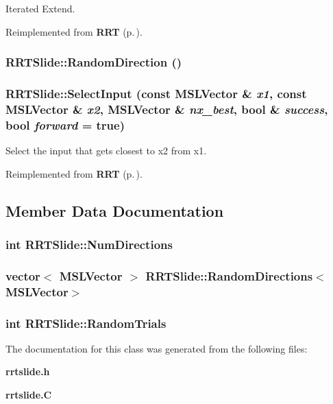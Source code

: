 Iterated Extend.



Reimplemented from {\bf RRT} {\rm (p.\,\pageref{classRRT_b3})}.
\subsubsection{ RRTSlide::Random\-Direction ()}\label{classRRTSlide_a4}


\subsubsection{ RRTSlide::Select\-Input (const {\bf MSLVector} \& {\em x1}, const {\bf MSLVector} \& {\em x2}, {\bf MSLVector} \& {\em nx\_\-best}, bool \& {\em success}, bool {\em forward} = true)\hspace{0.3cm}{\tt  [virtual]}}\label{classRRTSlide_a2}


Select the input that gets closest to x2 from x1.



Reimplemented from {\bf RRT} {\rm (p.\,\pageref{classRRT_b0})}.

\subsection{Member Data Documentation}
\subsubsection{\setlength{\rightskip}{0pt plus 5cm}int RRTSlide::Num\-Directions}\label{classRRTSlide_m1}


\subsubsection{\setlength{\rightskip}{0pt plus 5cm}vector$<$ {\bf MSLVector} $>$ RRTSlide::Random\-Directions$<${\bf MSLVector}$>$}\label{classRRTSlide_m2}


\subsubsection{\setlength{\rightskip}{0pt plus 5cm}int RRTSlide::Random\-Trials}\label{classRRTSlide_m0}




The documentation for this class was generated from the following files:\begin{CompactItemize}
\item 
{\bf rrtslide.h}\item 
{\bf rrtslide.C}\end{CompactItemize}
